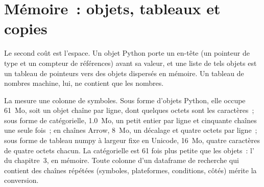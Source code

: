 \section{Mémoire~: objets, tableaux et copies}

Le second coût est l'espace. Un objet Python porte un en-tête (un pointeur de type et un compteur de références) avant sa valeur, et une liste de
tels objets est un tableau de pointeurs vers des objets dispersés en mémoire. Un tableau de nombres machine, lui, ne contient que les nombres.

\begin{omfigure}

\label{fig:pl:python-at-scale:memory}
\end{omfigure}

La  mesure une colonne de symboles. Sous forme d'objets Python, elle occupe 61~Mo, soit un objet chaîne par ligne, dont
quelques octets sont les caractères~; sous forme de catégorielle, 1.0~Mo, un petit entier par ligne et cinquante chaînes une seule fois~; en chaînes Arrow,
8~Mo, un décalage et quatre octets par ligne~; sous forme de tableau numpy à largeur fixe en Unicode, 16~Mo, quatre caractères de quatre octets chacun.
La catégorielle est 61 fois plus petite que les objets~: l' du chapitre~3, en mémoire. Toute colonne
d'un dataframe de recherche qui contient des chaînes répétées (symboles, plateformes, conditions, côtés) mérite la conversion.

